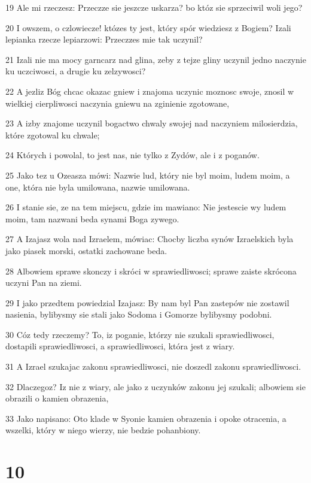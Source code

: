 \par 19 Ale mi rzeczesz: Przeczze sie jeszcze uskarza? bo któz sie sprzeciwil woli jego?
\par 20 I owszem, o czlowiecze! któzes ty jest, który spór wiedziesz z Bogiem? Izali lepianka rzecze lepiarzowi: Przeczzes mie tak uczynil?
\par 21 Izali nie ma mocy garncarz nad glina, zeby z tejze gliny uczynil jedno naczynie ku uczciwosci, a drugie ku zelzywosci?
\par 22 A jezliz Bóg chcac okazac gniew i znajoma uczynic moznosc swoje, znosil w wielkiej cierpliwosci naczynia gniewu na zginienie zgotowane,
\par 23 A izby znajome uczynil bogactwo chwaly swojej nad naczyniem milosierdzia, które zgotowal ku chwale;
\par 24 Których i powolal, to jest nas, nie tylko z Zydów, ale i z poganów.
\par 25 Jako tez u Ozeasza mówi: Nazwie lud, który nie byl moim, ludem moim, a one, która nie byla umilowana, nazwie umilowana.
\par 26 I stanie sie, ze na tem miejscu, gdzie im mawiano: Nie jestescie wy ludem moim, tam nazwani beda synami Boga zywego.
\par 27 A Izajasz wola nad Izraelem, mówiac: Chocby liczba synów Izraelskich byla jako piasek morski, ostatki zachowane beda.
\par 28 Albowiem sprawe skonczy i skróci w sprawiedliwosci; sprawe zaiste skrócona uczyni Pan na ziemi.
\par 29 I jako przedtem powiedzial Izajasz: By nam byl Pan zastepów nie zostawil nasienia, bylibysmy sie stali jako Sodoma i Gomorze bylibysmy podobni.
\par 30 Cóz tedy rzeczemy? To, iz poganie, którzy nie szukali sprawiedliwosci, dostapili sprawiedliwosci, a sprawiedliwosci, która jest z wiary.
\par 31 A Izrael szukajac zakonu sprawiedliwosci, nie doszedl zakonu sprawiedliwosci.
\par 32 Dlaczegoz? Iz nie z wiary, ale jako z uczynków zakonu jej szukali; albowiem sie obrazili o kamien obrazenia,
\par 33 Jako napisano: Oto klade w Syonie kamien obrazenia i opoke otracenia, a wszelki, który w niego wierzy, nie bedzie pohanbiony.

\chapter{10}


